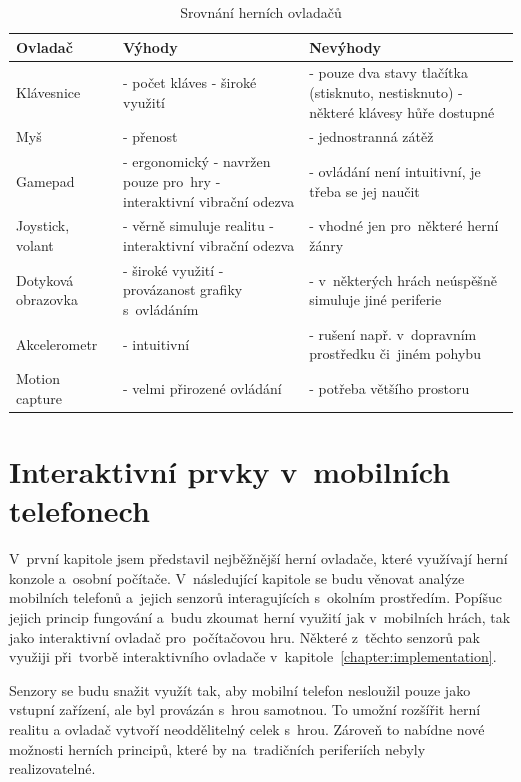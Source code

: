 \documentclass[thesis=B,czech,hidelinks]{FITthesis}[2012/06/26] %
\begin{document}
\begin{table}[h]
\caption{Srovnání herních ovladačů}
\begin{tabularx}{\textwidth}{|l|X|X|}
\hline
\textbf{Ovladač} & \textbf{Výhody} & \textbf{Nevýhody} \\ \hline
Klávesnice & - počet kláves \newline - široké využití & - pouze dva stavy tlačítka (stisknuto, nestisknuto) \newline - některé klávesy hůře dostupné \\ \hline
Myš & - přenost & - jednostranná zátěž \\ \hline
Gamepad & - ergonomický \newline - navržen pouze pro~hry \newline - interaktivní vibrační odezva & - ovládání není intuitivní, je třeba se jej naučit \\ \hline
Joystick, volant & - věrně simuluje realitu \newline - interaktivní vibrační odezva & - vhodné jen pro~některé herní žánry \\ \hline
Dotyková obrazovka & - široké využití \newline - provázanost grafiky s~ovládáním & - v~některých hrách neúspěšně simuluje jiné periferie \\ \hline
Akcelerometr & - intuitivní & - rušení např. v~dopravním prostředku či~jiném pohybu \\ \hline
Motion capture & - velmi přirozené ovládání & - potřeba většího prostoru \\ \hline

\end{tabularx}
\end{table}


\chapter{Interaktivní prvky v~mobilních telefonech}

V~první kapitole jsem představil nejběžnější herní ovladače, které využívají herní konzole a~osobní počítače. V~následující kapitole se budu věnovat analýze mobilních telefonů a~jejich senzorů interagujících s~okolním prostředím. Popíšuc jejich princip fungování a~budu zkoumat herní využití jak v~mobilních hrách, tak jako interaktivní ovladač pro~počítačovou hru. Některé z~těchto senzorů pak využiji při~tvorbě interaktivního ovladače v~kapitole~\ref{chapter:implementation}.

Senzory se budu snažit využít tak, aby mobilní telefon nesloužil pouze jako vstupní zařízení, ale byl provázán s~hrou samotnou. To umožní rozšířit herní realitu a ovladač vytvoří neoddělitelný celek s~hrou. Zároveň to nabídne nové možnosti herních principů, které by na~tradičních periferiích nebyly realizovatelné.
\end{document}
